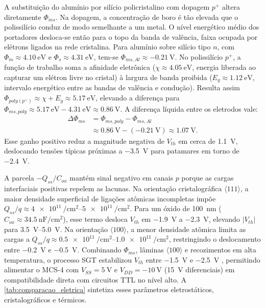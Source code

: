 A substituição do alumínio por silício policristalino com dopagem $p^+$ altera diretamente $\Phi_{ms}$. Na dopagem, a concentração de boro é tão elevada que o polissilício conduz de modo semelhante a um metal. O nível energético médio dos portadores desloca-se então para o topo da banda de valência, faixa ocupada por elétrons ligados na rede cristalina. Para alumínio sobre silício tipo $n$, com $\Phi_m \approx \SI{4,10}{\electronvolt}$ e $\Phi_s \approx \SI{4,31}{\electronvolt}$, tem-se $\Phi_{ms,Al} \approx \SI{-0,21}{\volt}$. No polissilício $p^+$, a função de trabalho soma a afinidade eletrônica ($\chi \approx \SI{4,05}{\electronvolt}$, energia liberada ao capturar um elétron livre no cristal) à largura de banda proibida ($E_g \approx \SI{1,12}{\electronvolt}$, intervalo energético entre as bandas de valência e condução). Resulta assim $\Phi_{poly(p^+)} \approx \chi + E_g \approx \SI{5,17}{\electronvolt}$, elevando a diferença para $\Phi_{ms,poly} \approx \SI{5,17}{\electronvolt} - \SI{4,31}{\electronvolt} \approx \SI{+0,86}{\volt}$. A diferença líquida entre os eletrodos vale:
\begin{equation}
\label{eq:delta_phims}
\begin{aligned}
\Delta \Phi_{ms} &= \Phi_{ms,poly} - \Phi_{ms,Al} \\
&\approx \SI{+0,86}{\volt} - (\SI{-0,21}{\volt}) \approx \SI{+1,07}{\volt}.
\end{aligned}
\end{equation}
Esse ganho positivo reduz a magnitude negativa de $V_{th}$ em cerca de \SI{1,1}{\volt}, deslocando tensões típicas próximas a \SI{-3,5}{\volt} para patamares em torno de \SI{-2,4}{\volt}.

A parcela $-Q_{ss}/C_{ox}$ mantém sinal negativo em canais $p$ porque as cargas interfaciais positivas repelem as lacunas. Na orientação cristalográfica $\langle 111 \rangle$, a maior densidade superficial de ligações atômicas incompletas impõe $Q_{ss}/q \approx \SIrange{4e11}{5e11}{\per\centi\meter\squared}$. Para um óxido de \SI{100}{\nano\meter} ($C_{ox} \approx \SI{34,5}{\nano\farad\per\centi\meter\squared}$), esse termo desloca $V_{th}$ em \SI{-1,9}{\volt} a \SI{-2,3}{\volt}, elevando $|V_{th}|$ para \SIrange{3,5}{5,0}{\volt}. Na orientação $\langle 100 \rangle$, a menor densidade atômica limita as cargas a $Q_{ss}/q \approx \SIrange{0,5e11}{1,0e11}{\per\centi\meter\squared}$, restringindo o deslocamento entre \SI{-0,2}{\volt} e \SI{-0,5}{\volt}. Combinando $\Phi_{ms}$, lâminas $\langle 100 \rangle$ e recozimentos em alta temperatura, o processo SGT estabilizou $V_{th}$ entre \SI{-1,5}{\volt} e \SI{-2,5}{\volt} \cite{faggin1970, klein1972patent}, permitindo alimentar o MCS-4 com $V_{SS} = \SI{+5}{\volt}$ e $V_{DD} = \SI{-10}{\volt}$ (\SI{15}{\volt} diferenciais) em compatibilidade direta com circuitos TTL no nível alto. A \cref{tab:comparacao_eletrica} sintetiza esses parâmetros eletrostáticos, cristalográficos e térmicos.

